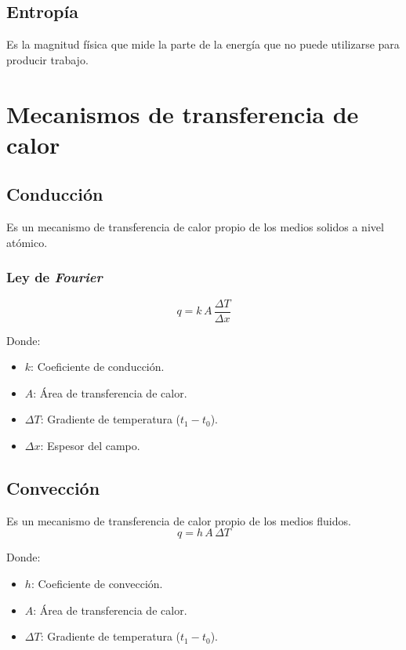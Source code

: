 \subsection{Entropía}
Es la magnitud física que mide la parte de la energía que no puede utilizarse
para producir trabajo.

\section{Mecanismos de transferencia de calor}

\subsection{Conducción}
Es un mecanismo de transferencia de calor propio de los medios solidos a nivel
atómico.

\subsubsection{Ley de \emph{Fourier}}
\begin{equation}
    q=k\,A\,\frac{\Delta T}{\Delta x}
\label{conduccion}
\end{equation}

Donde:
\begin{itemize}
    \item \emph{$k$}: Coeficiente de conducción.
    \item \emph{$A$}: Área de transferencia de calor.
    \item \emph{$\Delta T$}: Gradiente de temperatura ($t_1-t_0$).
    \item \emph{$\Delta x$}: Espesor del campo.
\end{itemize}

\subsection{Convección}
Es un mecanismo de transferencia de calor propio de los medios fluidos.
\begin{equation}
    q=h\,A\,\Delta T
\label{conveccion}
\end{equation}

Donde:
\begin{itemize}
    \item \emph{$h$}: Coeficiente de convección.
    \item \emph{$A$}: Área de transferencia de calor.
    \item \emph{$\Delta T$}: Gradiente de temperatura ($t_1-t_0$).
\end{itemize}


